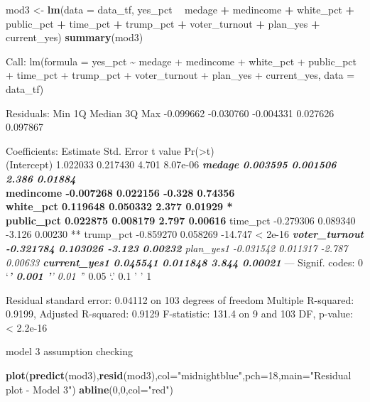 \documentclass[
]{article}
\newenvironment{Shaded}{\begin{snugshade}}{\end{snugshade}}
\newcommand{\DataTypeTok}[1]{\textcolor[rgb]{0.13,0.29,0.53}{#1}}
\newcommand{\DecValTok}[1]{\textcolor[rgb]{0.00,0.00,0.81}{#1}}
\newcommand{\KeywordTok}[1]{\textcolor[rgb]{0.13,0.29,0.53}{\textbf{#1}}}
\newcommand{\NormalTok}[1]{#1}
\newcommand{\OperatorTok}[1]{\textcolor[rgb]{0.81,0.36,0.00}{\textbf{#1}}}
\newcommand{\StringTok}[1]{\textcolor[rgb]{0.31,0.60,0.02}{#1}}
\begin{document}
\begin{Shaded}
\begin{Highlighting}[]
\NormalTok{mod3 <-}\StringTok{ }\KeywordTok{lm}\NormalTok{(}\DataTypeTok{data =}\NormalTok{ data_tf, yes_pct }\OperatorTok{~}\StringTok{ }\NormalTok{medage }\OperatorTok{+}\StringTok{ }\NormalTok{medincome }\OperatorTok{+}\StringTok{ }\NormalTok{white_pct }\OperatorTok{+}\StringTok{ }\NormalTok{public_pct }\OperatorTok{+}\StringTok{ }\NormalTok{time_pct }\OperatorTok{+}\StringTok{ }\NormalTok{trump_pct }\OperatorTok{+}\StringTok{ }\NormalTok{voter_turnout }\OperatorTok{+}\StringTok{ }\NormalTok{plan_yes }\OperatorTok{+}\StringTok{ }\NormalTok{current_yes)}
\KeywordTok{summary}\NormalTok{(mod3)}
\end{Highlighting}
\end{Shaded}

Call: lm(formula = yes\_pct \textasciitilde{} medage + medincome +
white\_pct + public\_pct + time\_pct + trump\_pct + voter\_turnout +
plan\_yes + current\_yes, data = data\_tf)

Residuals: Min 1Q Median 3Q Max -0.099662 -0.030760 -0.004331 0.027626
0.097867

Coefficients: Estimate Std. Error t value
Pr(\textgreater\textbar t\textbar)\\
(Intercept) 1.022033 0.217430 4.701 8.07e-06 \textbf{\emph{ medage
0.003595 0.001506 2.386 0.01884 }\\
medincome -0.007268 0.022156 -0.328 0.74356\\
white\_pct 0.119648 0.050332 2.377 0.01929 *\\
public\_pct 0.022875 0.008179 2.797 0.00616 } time\_pct -0.279306
0.089340 -3.126 0.00230 ** trump\_pct -0.859270 0.058269 -14.747
\textless{} 2e-16 \emph{\textbf{ voter\_turnout -0.321784 0.103026
-3.123 0.00232 } plan\_yes1 -0.031542 0.011317 -2.787 0.00633 \textbf{
current\_yes1 0.045541 0.011848 3.844 0.00021 }} --- Signif. codes: 0
`\emph{\textbf{' 0.001 '}' 0.01 '}' 0.05 `.' 0.1 ' ' 1

Residual standard error: 0.04112 on 103 degrees of freedom Multiple
R-squared: 0.9199, Adjusted R-squared: 0.9129 F-statistic: 131.4 on 9
and 103 DF, p-value: \textless{} 2.2e-16

model 3 assumption checking

\begin{Shaded}
\begin{Highlighting}[]
\KeywordTok{plot}\NormalTok{(}\KeywordTok{predict}\NormalTok{(mod3),}\KeywordTok{resid}\NormalTok{(mod3),}\DataTypeTok{col=}\StringTok{"midnightblue"}\NormalTok{,}\DataTypeTok{pch=}\DecValTok{18}\NormalTok{,}\DataTypeTok{main=}\StringTok{"Residual plot - Model 3"}\NormalTok{)}
\KeywordTok{abline}\NormalTok{(}\DecValTok{0}\NormalTok{,}\DecValTok{0}\NormalTok{,}\DataTypeTok{col=}\StringTok{"red"}\NormalTok{)}
\end{Highlighting}
\end{Shaded}
\end{document}
